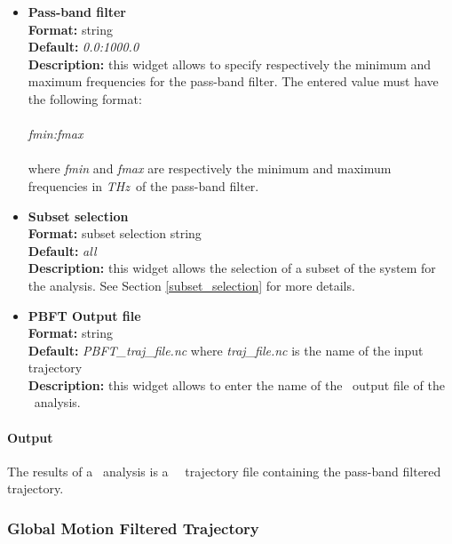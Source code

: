 \documentclass[a4paper,11pt]{report}
\newcommand{\thz}{\textit{THz}}
\begin{document}
\begin{itemize}
\hypertarget{pbft_pass_band_filter}{}
\item \textbf{Pass-band filter}\\
\textbf{Format:} string\\
\textbf{Default:} \textit{0.0:1000.0}\\
\textbf{Description:} this widget allows to specify respectively the minimum and maximum frequencies for the pass-band filter. 
The entered value must have the following format:
\\\\
\textit{fmin:fmax}
\\\\
where \textit{fmin} and \textit{fmax} are respectively the minimum and maximum frequencies in \thz\ of the pass-band filter.
\newpage
\hypertarget{pbft_subset_selection}{}
\item \textbf{Subset selection}\\
\textbf{Format:} subset selection string\\
\textbf{Default:} \textit{all}\\
\textbf{Description:} this widget allows the selection of a subset of the system for the analysis. 
See Section \ref{subset_selection} for more details.

\hypertarget{pbft_pbft_output_file}{}
\item \textbf{PBFT Output file}\\
\textbf{Format:} string\\
\textbf{Default:} \textit{PBFT\_traj\_file.nc} where \textit{traj\_file.nc} is the name of the input trajectory\\
\textbf{Description:} this widget allows to enter the name of the \NetCDF\ output file of the \PBFT\ analysis.
\end{itemize}

\paragraph{Output\\}
The results of a \PBFT\ analysis is a \MMTK\ \NetCDF\ trajectory file containing the pass-band filtered trajectory.

\subsubsection{Global Motion Filtered Trajectory}
\label{gmft}
\end{document}
